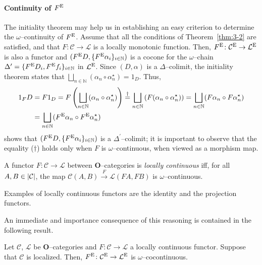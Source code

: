 \paragraph{Continuity of \(F^\textup{E}\)}
The initiality theorem may help us in establishing an easy criterion to determine the \(\omega{}\)--continuity of \(F^\textup{E}\).
Assume that all the conditions of Theorem~\ref{thm:3-2} are satisfied, and that \(F \colon \mathcal{C} \to \mathcal{L}\) is a locally monotonic function.
Then, \(F^\textup{E} \colon \mathcal{C}^\textup{E} \to \mathcal{L}^\textup{E}\) is also a functor and \((F^\textup{E}D, \lbrace F^\textup{E}\alpha_i\rbrace_{i \in \mathbb{N}})\) is a cocone for the \(\omega{}\)--chain \(\Delta^\prime = \lbrace F^\textup{E} D_i, F^\textup{E}f_i \rbrace_{i \in \mathbb{N}}\) in \(\mathcal{L}^\textup{E}\).
Since \((D,\alpha)\) is a \(\Delta{}\)--colimit, the initiality theorem states that \(\bigsqcup_{n \in \mathbb{N}}(\alpha_n \circ \alpha_n^\star) = 1_D\).
Thus,
\begin{equation*}
  \begin{split}
    1_FD &= F1_D = F\left(\bigsqcup_{n \in \mathbb{N}}(\alpha_n \circ \alpha_n^\star)\right) \overset{\dagger}{=} \bigsqcup_{n \in \mathbb{N}}\left(F(\alpha_n \circ \alpha_n^\star)\right) = \bigsqcup_{n \in \mathbb{N}}(F\alpha_n \circ F\alpha_n^\star) \\
    &= \bigsqcup_{n \in \mathbb{N}}(F^\textup{E}\alpha_n \circ F^\textup{E}\alpha_n^\star)
  \end{split}
\end{equation*}
shows that \((F^\textup{E}D, \lbrace F^\textup{E}\alpha_i\rbrace_{i \in \mathbb{N}})\) is a \(\Delta^\prime{}\)--colimit; it is important to observe that the equality (\(\dagger{}\)) holds only when \(F\) is \(\omega{}\)--continuous, when viewed as a morphism map.

\begin{dfn}
  A functor \(F \colon \mathcal{C} \to \mathcal{L}\) between \(\mathbf{O}\)--categories is \emph{locally continuous} iff, for all \(A, B \in \lvert \mathcal{C} \rvert\), the map \(\mathcal{C}(A,B) \overset{F}{\to}\mathcal{L}(FA,FB)\) is \(\omega{}\)--continuous.
\end{dfn}

Examples of locally continuous functors are the identity and the projection functors.

An immediate and importance consequence of this reasoning is contained in the following result.

\begin{thm}\label{thm:cont}
  Let \(\mathcal{C}\), \(\mathcal{L}\) be \(\mathbf{O}\)--categories and \(F \colon \mathcal{C} \to \mathcal{L}\) a locally continuous functor.
  Suppose that \(\mathcal{C}\) is localized.
  Then, \(F^\textup{E} \colon \mathcal{C}^\textup{E} \to \mathcal{L}^\textup{E}\) is \(\omega{}\)--cocontinuous.
\end{thm}

